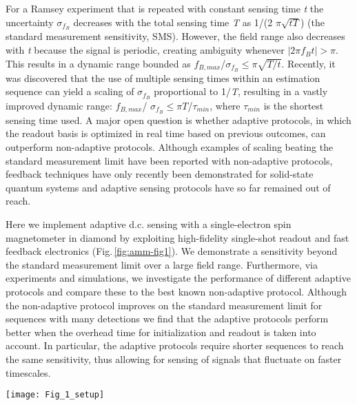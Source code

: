 For a Ramsey experiment that is repeated with constant sensing time \textit{t} the uncertainty $\sigma_{f_B}$ decreases with the total sensing time \textit{T} as 1/(2 $\pi \sqrt{tT}$) (the standard measurement sensitivity, SMS).  However, the field range also decreases with \textit{t} because the signal is periodic, creating ambiguity whenever $|2\pi f_B t| > \pi $. This results in a dynamic range bounded as  $f_{B,max}$/$\sigma_{f_B}  \le \pi \sqrt{T/t}$.  Recently, it was discovered\cite{Said_Phys.Rev.B_2011} that the use of multiple sensing times within an estimation sequence can yield a scaling of $\sigma_{f_B}$ proportional to 1/\textit{T}, resulting in a vastly improved dynamic range: $f_{B,max}$/ $\sigma_{f_B} \le  \pi T $/$ \tau_{min}$, where $\tau_{min}$ is the shortest sensing time used. A major open question is whether adaptive protocols, in which the readout basis is optimized in real time based on previous outcomes, can outperform non-adaptive protocols. Although examples of scaling beating the standard measurement limit have been reported with non-adaptive protocols\cite{Waldherr_NatNano_2012,Nusran_NatNano_2012}, feedback techniques have only recently been demonstrated for solid-state quantum systems\cite{Vijay_Nature_2012,Blok_NatPhys_2014,Shulman_NatCommun_2014} and adaptive sensing protocols have so far remained out of reach.


Here we implement adaptive d.c. sensing with a single-electron spin magnetometer in diamond by exploiting high-fidelity single-shot readout and fast feedback electronics (Fig.\,\ref{fig:amm-fig1}). We demonstrate a sensitivity beyond the standard measurement limit over a large field range. Furthermore, via experiments and simulations, we investigate the performance of different adaptive protocols and compare these to the best known non-adaptive protocol. Although the non-adaptive protocol improves on the standard measurement limit for sequences with many detections we find that the adaptive protocols perform better when the overhead time for initialization and readout is taken into account. In particular, the adaptive protocols require shorter sequences to reach the same sensitivity, thus allowing for sensing of signals that fluctuate on faster timescales.

\begin{figure*}
	\centering
	\texttt{[image: Fig\_1\_setup]}
	\caption{\label{fig:amm-fig1} \textbf{Experiment concept and apparatus.} The adaptive frequency estimation protocol consists of a sequence of initialization, sensing, measurement operations. After each measurement run, the outcome $\mu$ is used to update the estimate of the frequency $f_B$, which is then used to optimize the sensing parameters for the following run. Experimentally, the frequency estimation and adaptive calculation of the phase are performed in real-time by a microprocessor.}
\end{figure*}

